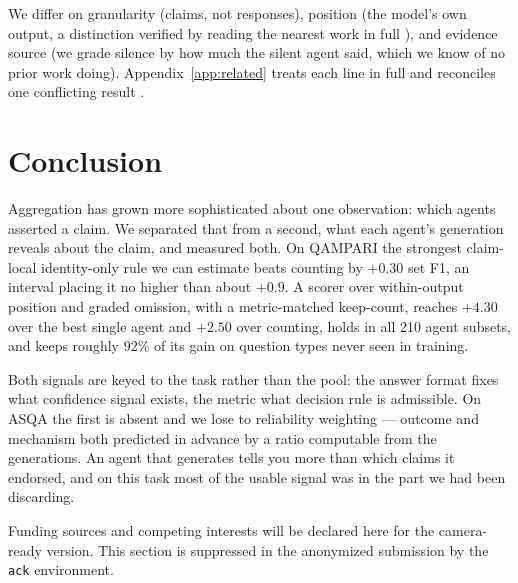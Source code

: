 \documentclass{article}
\begin{document}
We differ on granularity (claims, not responses), position (the model's own output, a distinction verified by reading the nearest work in full \cite{guo2024serial}), and evidence source (we grade silence by how much the silent agent said, which we know of no prior work doing). Appendix~\ref{app:related} treats each line in full and reconciles one conflicting result \cite{islam2025curious}.


\section{Conclusion}
\label{sec:conclusion}

Aggregation has grown more sophisticated about one observation: which agents asserted a claim. We separated that from a second, what each agent's generation reveals about the claim, and measured both. On QAMPARI the strongest claim-local identity-only rule we can estimate beats counting by $+0.30$ set F1, an interval placing it no higher than about $+0.9$. A scorer over within-output position and graded omission, with a metric-matched keep-count, reaches $+4.30$ over the best single agent and $+2.50$ over counting, holds in all 210 agent subsets, and keeps roughly $92\%$ of its gain on question types never seen in training.

Both signals are keyed to the task rather than the pool: the answer format fixes what confidence signal exists, the metric what decision rule is admissible. On ASQA the first is absent and we lose to reliability weighting --- outcome and mechanism both predicted in advance by a ratio computable from the generations. An agent that generates tells you more than which claims it endorsed, and on this task most of the usable signal was in the part we had been discarding.


\begin{ack}
Funding sources and competing interests will be declared here for the camera-ready
version. This section is suppressed in the anonymized submission by the
\texttt{ack} environment.
\end{ack}


%
\end{document}
